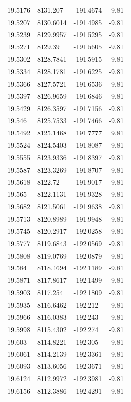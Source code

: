 \begin{table}[H]
\begin{tabular}{llll}
19.5176 & 8131.207 & -191.4674 & -9.81 \\
19.5207 & 8130.6014 & -191.4985 & -9.81 \\
19.5239 & 8129.9957 & -191.5295 & -9.81 \\
19.5271 & 8129.39 & -191.5605 & -9.81 \\
19.5302 & 8128.7841 & -191.5915 & -9.81 \\
19.5334 & 8128.1781 & -191.6225 & -9.81 \\
19.5366 & 8127.5721 & -191.6536 & -9.81 \\
19.5397 & 8126.9659 & -191.6846 & -9.81 \\
19.5429 & 8126.3597 & -191.7156 & -9.81 \\
19.546 & 8125.7533 & -191.7466 & -9.81 \\
19.5492 & 8125.1468 & -191.7777 & -9.81 \\
19.5524 & 8124.5403 & -191.8087 & -9.81 \\
19.5555 & 8123.9336 & -191.8397 & -9.81 \\
19.5587 & 8123.3269 & -191.8707 & -9.81 \\
19.5618 & 8122.72 & -191.9017 & -9.81 \\
19.565 & 8122.1131 & -191.9328 & -9.81 \\
19.5682 & 8121.5061 & -191.9638 & -9.81 \\
19.5713 & 8120.8989 & -191.9948 & -9.81 \\
19.5745 & 8120.2917 & -192.0258 & -9.81 \\
19.5777 & 8119.6843 & -192.0569 & -9.81 \\
19.5808 & 8119.0769 & -192.0879 & -9.81 \\
19.584 & 8118.4694 & -192.1189 & -9.81 \\
19.5871 & 8117.8617 & -192.1499 & -9.81 \\
19.5903 & 8117.254 & -192.1809 & -9.81 \\
19.5935 & 8116.6462 & -192.212 & -9.81 \\
19.5966 & 8116.0383 & -192.243 & -9.81 \\
19.5998 & 8115.4302 & -192.274 & -9.81 \\
19.603 & 8114.8221 & -192.305 & -9.81 \\
19.6061 & 8114.2139 & -192.3361 & -9.81 \\
19.6093 & 8113.6056 & -192.3671 & -9.81 \\
19.6124 & 8112.9972 & -192.3981 & -9.81 \\
19.6156 & 8112.3886 & -192.4291 & -9.81 \\

\end{tabular}
\end{table}
